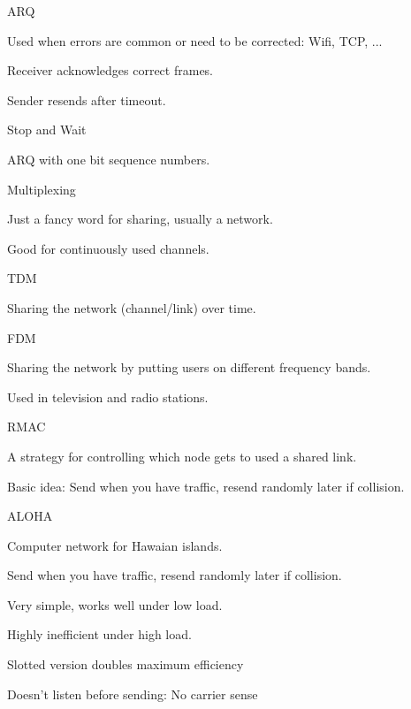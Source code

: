 \documentclass[main.tex]{subfiles}
\begin{document}
\begin{card}{ARQ}
\item Used when errors are common or need to be corrected: Wifi, TCP, ...
\item Receiver acknowledges correct frames.
\item Sender resends after timeout.
\end{card}

\begin{card}{Stop and Wait}
\item ARQ with one bit sequence numbers.
\end{card}

\begin{card}{Multiplexing}
\item Just a fancy word for sharing, usually a network.
\item Good for continuously used channels.
\end{card}

\begin{card}{TDM}
\item Sharing the network (channel/link) over time.
\end{card}

\begin{card}{FDM}
\item Sharing the network by putting users on different frequency bands.
\item Used in television and radio stations.
\end{card}

\begin{card}{RMAC}
\item A strategy for controlling which node gets to used a shared link.
\item Basic idea: Send when you have traffic, resend randomly later if collision.
\end{card}

\begin{card}{ALOHA}
\item Computer network for Hawaian islands.
\item Send when you have traffic, resend randomly later if collision.
\item Very simple, works well under low load.
\item Highly inefficient under high load.
\item Slotted version doubles maximum efficiency
\item Doesn't listen before sending: No carrier sense
\end{card}
\end{document}
